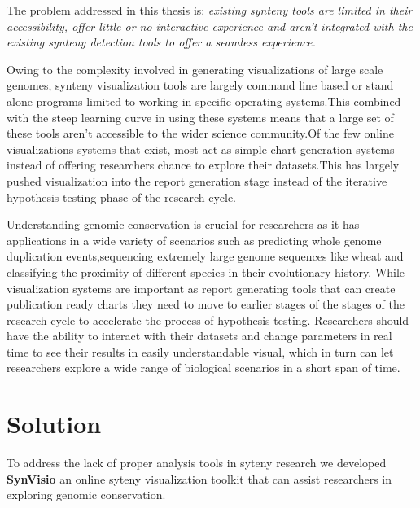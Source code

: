 The problem addressed in this thesis is: \textit{existing synteny tools are limited in their accessibility, offer little or no interactive experience and aren't integrated with the existing synteny detection tools to offer a seamless experience.}

Owing to the complexity involved in generating visualizations of large scale genomes, synteny visualization tools are largely command line based or stand alone programs limited to working in specific operating systems.This combined with the steep learning curve in using these systems means that a large set of these tools aren't accessible to the wider science community.Of the few online visualizations systems that exist, most act as simple chart generation systems instead of offering researchers chance to explore their datasets.This has largely pushed visualization into the report generation stage instead of the  iterative hypothesis testing phase of the research cycle.

Understanding genomic conservation is crucial for researchers as it has applications in a wide variety of scenarios such as predicting whole genome duplication events,sequencing extremely large genome sequences like wheat and classifying the proximity of different species in their evolutionary history.
While visualization systems are important as report generating tools that can create publication ready charts they need to move to earlier stages of the stages of the research cycle to accelerate the process of hypothesis testing.
Researchers should have the ability to interact with their datasets and change parameters in real time to see their results in easily understandable visual,
which in turn can let researchers explore a wide range of biological scenarios in a short span of time.

\section{Solution}

To address the lack of proper analysis tools in syteny research we developed \textbf{SynVisio} an online syteny visualization toolkit that can assist researchers in exploring genomic conservation.

